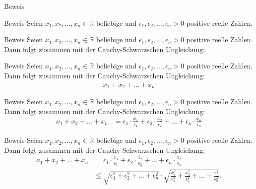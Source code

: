 \documentclass[10pt]{beamer}
\def\bR{\mathbb{R}}
\begin{document}
\begin{frame}{Beweis}
    
\end{frame}



\begin{frame}{Beweis}
    Seien \( x_{1}, x_{2}, \ldots, x_{n} \in \bR \) beliebige und \( \epsilon_{1}, \epsilon_{2}, \ldots, \epsilon_{n} > 0 \) positive reelle Zahlen.
\end{frame}



\begin{frame}{Beweis}
    Seien \( x_{1}, x_{2}, \ldots, x_{n} \in \bR \) beliebige und \( \epsilon_{1}, \epsilon_{2}, \ldots, \epsilon_{n} > 0 \) positive reelle Zahlen. Dann folgt zusammen mit der Cauchy-Schwarzschen Ungleichung:
\end{frame}



\begin{frame}{Beweis}
    Seien \( x_{1}, x_{2}, \ldots, x_{n} \in \bR \) beliebige und \( \epsilon_{1}, \epsilon_{2}, \ldots, \epsilon_{n} > 0 \) positive reelle Zahlen. Dann folgt zusammen mit der Cauchy-Schwarzschen Ungleichung:
    \begin{align*}
        x_{1} + x_{2} + \ldots + x_{n}
    \end{align*}
\end{frame}



\begin{frame}{Beweis}
    Seien \( x_{1}, x_{2}, \ldots, x_{n} \in \bR \) beliebige und \( \epsilon_{1}, \epsilon_{2}, \ldots, \epsilon_{n} > 0 \) positive reelle Zahlen. Dann folgt zusammen mit der Cauchy-Schwarzschen Ungleichung:
    \begin{align*}
        x_{1} + x_{2} + \ldots + x_{n}
        & = \epsilon_{1} \cdot \frac{x_{1}}{\epsilon_{1}} + \epsilon_{2} \cdot \frac{x_{2}}{\epsilon_{2}} + \ldots + \epsilon_{n} \cdot \frac{x_{n}}{\epsilon_{n}}
    \end{align*}
\end{frame}



\begin{frame}{Beweis}
    Seien \( x_{1}, x_{2}, \ldots, x_{n} \in \bR \) beliebige und \( \epsilon_{1}, \epsilon_{2}, \ldots, \epsilon_{n} > 0 \) positive reelle Zahlen. Dann folgt zusammen mit der Cauchy-Schwarzschen Ungleichung:
    \begin{align*}
        x_{1} + x_{2} + \ldots + x_{n}
        & = \epsilon_{1} \cdot \frac{x_{1}}{\epsilon_{1}} + \epsilon_{2} \cdot \frac{x_{2}}{\epsilon_{2}} + \ldots + \epsilon_{n} \cdot \frac{x_{n}}{\epsilon_{n}} \\
        & \leq \sqrt{\epsilon_{1}^{2} + \epsilon_{2}^{2} + \ldots + \epsilon_{n}^{2}} \cdot \sqrt{\frac{x_{1}^{2}}{\epsilon_{1}^{2}} + \frac{x_{2}^{2}}{\epsilon_{2}^{2}} + \ldots + \frac{x_{n}^{2}}{\epsilon_{n}^{2}}}.
    \end{align*}
\end{frame}
\end{document}
